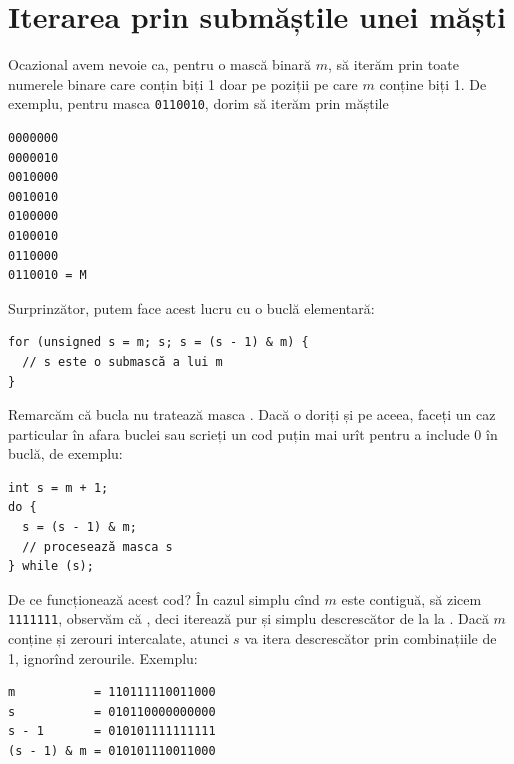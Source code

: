 \documentclass[../main.tex]{subfiles}
\begin{document}
\section{Iterarea prin submăștile unei măști}

Ocazional avem nevoie ca, pentru o mască binară $m$, să iterăm prin toate numerele binare care conțin biți 1 doar pe poziții pe care $m$ conține biți 1. De exemplu, pentru masca \texttt{0110010}, dorim să iterăm prin măștile

\begin{verbatim}
0000000
0000010
0010000
0010010
0100000
0100010
0110000
0110010 = M
\end{verbatim}

Surprinzător, putem face acest lucru cu o buclă elementară:

\begin{verbatim}
for (unsigned s = m; s; s = (s - 1) & m) {
  // s este o submască a lui m
}
\end{verbatim}

Remarcăm că bucla nu tratează masca . Dacă o doriți și pe aceea, faceți un caz particular în afara buclei sau scrieți un cod puțin mai urît pentru a include 0 în buclă, de exemplu:

\begin{verbatim}
int s = m + 1;
do {
  s = (s - 1) & m;
  // procesează masca s
} while (s);
\end{verbatim}

De ce funcționează acest cod? În cazul simplu cînd $m$ este contiguă, să zicem \texttt{1111111}, observăm că , deci  iterează pur și simplu descrescător de la  la . Dacă $m$ conține și zerouri intercalate, atunci $s$ va itera descrescător prin combinațiile de 1, ignorînd zerourile. Exemplu:

\begin{verbatim}
m           = 110111110011000
s           = 010110000000000
s - 1       = 010101111111111
(s - 1) & m = 010101110011000
\end{verbatim}
\end{document}
